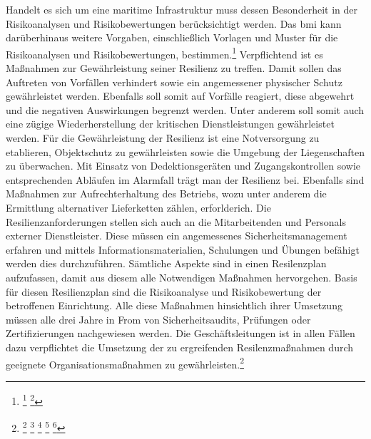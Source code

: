 \documentclass[11pt,a4paper,hidelinks]{article}   %
\begin{document}
                Handelt es sich um eine maritime Infrastruktur muss dessen Besonderheit in der Risikoanalysen und Risikobewertungen berücksichtigt werden. Das \gls{bmi} kann darüberhinaus weitere Vorgaben, einschließlich Vorlagen und Muster für die Risikoanalysen und Risikobewertungen, bestimmen.\footnote{
                    \footcite[Vgl.][, §11, Absatz 2]{KRITIS-DachG}
                    \footcite[Vgl.][, §12]{KRITIS-DachG}
                } Verpflichtend ist es Maßnahmen zur Gewährleistung seiner Resilienz zu treffen. Damit sollen das Auftreten von Vorfällen verhindert sowie ein angemessener physischer Schutz gewährleistet werden. Ebenfalls soll somit auf Vorfälle reagiert, diese abgewehrt und die negativen Auswirkungen begrenzt werden. Unter anderem soll somit auch eine zügige Wiederherstellung der kritischen Dienstleistungen gewährleistet werden. Für die Gewährleistung der Resilienz ist eine Notversorgung zu etablieren, Objektschutz zu gewährleisten sowie die Umgebung der Liegenschaften zu überwachen. Mit Einsatz von Dedektionsgeräten und Zugangskontrollen sowie entsprechenden Abläufen im Alarmfall trägt man der Resilienz bei. Ebenfalls sind Maßnahmen zur Aufrechterhaltung des Betriebs, wozu unter anderem die Ermittlung alternativer Lieferketten zählen, erforlderich. Die Resilienzanforderungen stellen sich auch an die Mitarbeitenden und Personals externer Dienstleister. Diese müssen ein angemessenes Sicherheitsmanagement erfahren und mittels Informationsmaterialien, Schulungen und Übungen befähigt werden dies durchzuführen. Sämtliche Aspekte sind in einen Resilenzplan aufzufassen, damit aus diesem alle Notwendigen Maßnahmen hervorgehen. Basis für diesen Resilienzplan sind die Risikoanalyse und Risikobewertung der betroffenen Einrichtung. Alle diese Maßnahmen hinsichtlich ihrer Umsetzung müssen alle drei Jahre in From von Sicherheitsaudits, Prüfungen oder Zertifizierungen nachgewiesen werden. Die Geschäftsleitungen ist in allen Fällen dazu verpflichtet die Umsetzung der zu ergreifenden Resilenzmaßnahmen durch geeignete Organisationsmaßnahmen zu gewährleisten.\footnote{
                    \footcite[Vgl.][, §13]{KRITIS-DachG}
                    \footcite[Vgl.][, §14, Absatz 2]{KRITIS-DachG}
                    \footcite[Vgl.][, §16]{KRITIS-DachG}
                    \footcite[Vgl.][, §20, Absatz 1]{KRITIS-DachG}
                    \footcite[Vgl.][, §39, Absatz 1]{NIS2UmsuCG}
                }
\end{document}
